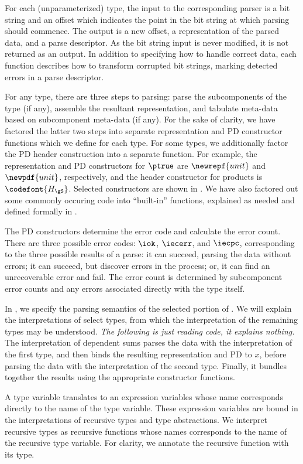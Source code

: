 For each (unparameterized) type, the input to the corresponding parser
is a bit string and an offset which indicates the point in the bit
string at which parsing should commence.  The output is a new offset,
a representation of the parsed data, and a parse descriptor. As the
bit string input is never modified, it is not returned as an output.
In addition to specifying how to handle correct data, each function
describes how to transform corrupted bit strings, marking detected
errors in a parse descriptor.

For any type, there are three steps to parsing: parse the
subcomponents of the type (if any), assemble the resultant
representation, and tabulate meta-data based on subcomponent meta-data
(if any). For the sake of clarity, we have factored the latter two
steps into separate representation and PD constructor functions which
we define for each type. For some types, we additionally factor the PD
header construction into a separate function. For example, the
representation and PD constructors for $\ptrue$ are $\newrepf {unit}$
and $\newpdf {unit}$, respectively, and the header constructor for
products is ${\codefont{H_{\gS}}}$. Selected constructors are shown in
. We have also factored out some commonly
occuring code into ``built-in'' functions, explained as needed and
defined formally in .

The PD constructors determine the error code and calculate the error
count.  There are three possible error codes: $\iok$, $\iecerr$, and
$\iecpc$, corresponding to the three possible results of a parse: it
can succeed, parsing the data without errors; it can succeed, but
discover errors in the process; or, it can find an unrecoverable error
and fail.  The error count is determined by subcomponent error counts
and any errors associated directly with the type itself.

In , we specify the parsing semantics of the
selected portion of \ddc{}. We will explain the interpretations of
select types, from which the interpretation of the remaining types may be
understood. \emph{The following is just reading code, it explains
  nothing.} The interpretation of dependent sums parses the data with
the interpretation of the first type, and then binds the resulting
representation and PD to $x$, before parsing the data with the
interpretation of the second type. Finally, it bundles together the
results using the appropriate constructor functions.

A type variable translates to an expression variables whose name
corresponds directly to the name of the type variable. These
expression variables are bound in the interpretations of recursive
types and type abstractions. We interpret recursive types as recursive
functions whose names corresponds to the name of the recursive type
variable. For clarity, we annotate the recursive function with its
type.

